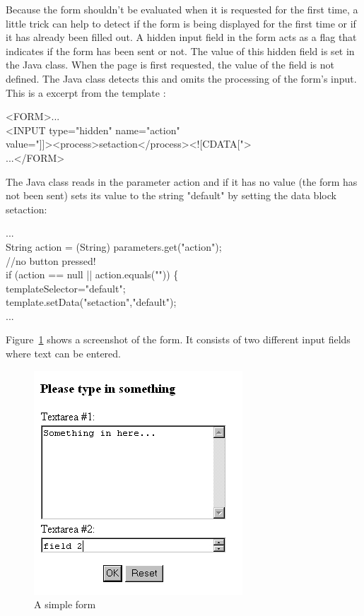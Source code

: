 Because the form shouldn't be evaluated when it is requested for the
first time, a little trick can help to detect if the form is being
displayed for the first time or if it has already been filled out. A
hidden input field in the form acts as a flag that indicates if the
form has been sent or not. The value of this hidden field
is set in the Java class. When the page is first requested, the value of
the field is not defined. The Java class detects this and omits the processing
of the form's input. This is a excerpt from the template :

\begin{xml}
<FORM>...\\
\xtaba <INPUT type="hidden" name="action"\\
\xtaba value="]]><process>setaction</process><![CDATA[">\\
...</FORM>\\
\end{xml}

The Java class reads in the parameter {\name action} and if it has no value (the form has
not been sent) sets its value to the string "default" by setting the data block
{\name setaction}:

\begin{java}
...\\
String action = (String) parameters.get("action");\\
//no button pressed!\\
if (action == null || action.equals("")) \{\\
\jtaba        templateSelector="default";\\
\jtaba        template.setData("setaction","default");\\
...\\
\end{java}

Figure~\ref{simple form} shows a screenshot of the form. It consists of
two different input fields where text can be entered.

\begin{figure}
\begin{center}
\includegraphics[clip,width=0.4\linewidth]{pics/modules/38}
\end{center}
\caption[A simple form]{A simple form}
\label{simple form}
\end{figure}


